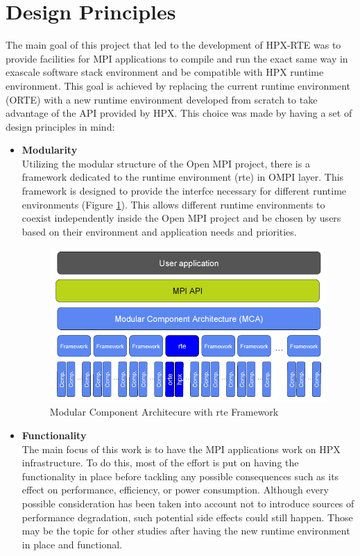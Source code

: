 \section{Design Principles}
\label{sec:design}
The main goal of this project that led to the development of HPX-RTE was to provide facilities for MPI applications to compile and run the exact same way in exascale software stack environment and be compatible with HPX runtime environment. This goal is achieved by replacing the current runtime environment (ORTE) with a new runtime environment developed from scratch to take advantage of the API provided by HPX. This choice was made by having a set of design principles in mind:

\begin{itemize}
\item \textbf{Modularity}\\
  Utilizing the modular structure of the Open MPI project, there is a framework dedicated to the runtime environment (rte) in OMPI layer. This framework is designed to provide the interfce necessary for different runtime environments (Figure \ref{fig:MCA-hpx-rte}). This allows different runtime environments to coexist independently inside the Open MPI project and be chosen by users based on their environment and application needs and priorities.

\begin{figure}[ht]
\centering
\includegraphics[scale=0.5]{images/MCA-hpx-rte.png}
\caption[Modular Component Architecure with rte Framework]{Modular Component Architecure with rte Framework}
\label{fig:MCA-hpx-rte}
\end{figure}
  
\item \textbf{Functionality}\\
  The main focus of this work is to have the MPI applications work on HPX infrastructure. To do this, most of the effort is put on having the functionality in place before tackling any possible consequences such as its effect on performance, efficiency, or power consumption. Although every possible consideration has been taken into account not to introduce sources of performance degradation, such potential side effects could still happen. Those may be the topic for other studies after having the new runtime environment in place and functional.
  

\end{itemize}
